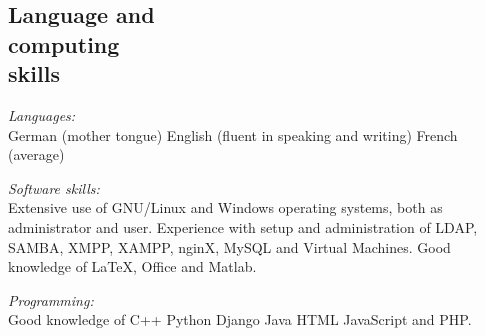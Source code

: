 \documentclass[margin,line]{resume}
\def\tb{\textbullet\;}
\begin{document}
\begin{resume}
\section{\mysidestyle Language and\\ computing \\skills}

{\it Languages:}\\
  \tb German (mother tongue)
  \tb English (fluent in speaking and writing)
  \tb French (average)



{\it Software skills:}\\
  Extensive use of \tb GNU/Linux and \tb Windows operating systems, both as administrator and user.
  Experience with setup and administration of \tb LDAP, \tb SAMBA, \tb XMPP, \tb XAMPP, \tb nginX, \tb MySQL and \tb Virtual Machines.
  Good knowledge of \tb \LaTeX, \tb Office and \tb Matlab.

{\it Programming:}\\
  Good knowledge of \tb C++ \tb Python \tb Django \tb Java \tb HTML \tb JavaScript and \tb PHP.


\end{resume}
\end{document}
